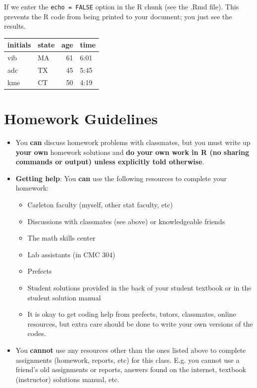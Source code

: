 \documentclass[
]{book}
\providecommand{\tightlist}{%
  \setlength{\itemsep}{0pt}\setlength{\parskip}{0pt}}
\begin{document}
If we enter the \texttt{echo\ =\ FALSE} option in the R chunk (see the .Rmd file). This prevents the R code from being printed to your document; you just see the results.

\begin{tabular}{l|l|r|l}
\hline
initials & state & age & time\\
\hline
vib & MA & 61 & 6:01\\
\hline
adc & TX & 45 & 5:45\\
\hline
kme & CT & 50 & 4:19\\
\hline
\end{tabular}

\hypertarget{homework-guidelines}{%
\chapter{Homework Guidelines}\label{homework-guidelines}}

\begin{itemize}
\tightlist
\item
  You \textbf{can} discuss homework problems with classmates, but you must write up \textbf{your own} homework solutions and \textbf{do your own work in R (no sharing commands or output) unless explicitly told otherwise}.
\item
  \textbf{Getting help}: You \textbf{can} use the following resources to complete your homework:

  \begin{itemize}
  \tightlist
  \item
    Carleton faculty (myself, other stat faculty, etc)
  \item
    Discussions with classmates (see above) or knowledgeable friends
  \item
    The math skills center
  \item
    Lab assistants (in CMC 304)
  \item
    Prefects
  \item
    Student solutions provided in the back of your student textbook or in the student solution manual
  \item
    It is okay to get coding help from prefects, tutors, classmates, online resources, but extra care should be done to write your own versions of the codes.
  \end{itemize}
\item
  You \textbf{cannot} use any resources other than the ones listed above to complete assignments (homework, reports, etc) for this class. E.g. you cannot use a friend's old assignments or reports, answers found on the internet, textbook (instructor) solutions manual, etc.
\end{itemize}
\end{document}
